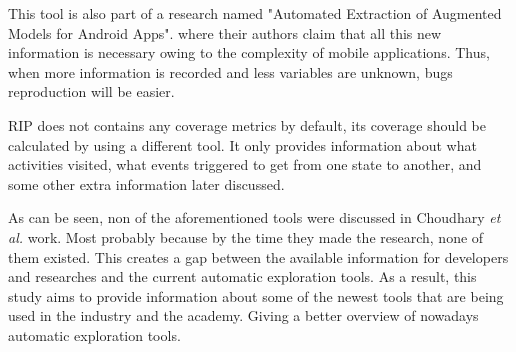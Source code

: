 This tool is also part of a research named "Automated Extraction of Augmented Models for Android Apps". where their authors claim that all this new information is necessary owing to the complexity of mobile applications. Thus, when more information is recorded and less variables are unknown, bugs reproduction will be easier.

RIP does not contains any coverage metrics by default, its coverage should be calculated by using a different tool. It only provides information about what activities visited, what events triggered to get from one state to another, and some other extra information later discussed.

As can be seen, non of the aforementioned tools were discussed in Choudhary \textit{et al.} \MARIO{[CITE]} work. Most probably because by the time they made the research, none of them existed. This creates a gap between the available information for developers and researches and the current automatic exploration tools. As a result, this study aims to provide information about some of the newest tools that are being used in the industry and the academy. Giving a better overview of nowadays automatic exploration tools.